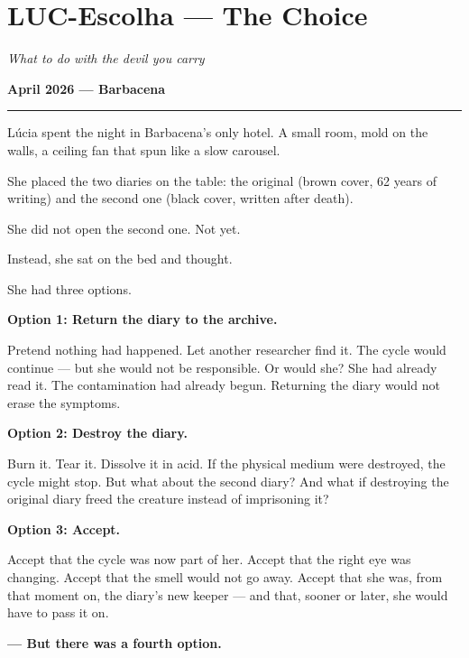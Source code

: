 \section*{\textbf{LUC-Escolha} --- The Choice}

\noindent \textit{What to do with the devil you carry}

\noindent \textbf{April 2026 --- Barbacena}

\vspace{0.5em}\noindent\rule{\textwidth}{0.5pt}\vspace{0.5em}

\noindent Lúcia spent the night in Barbacena's only hotel. A small room, mold on the walls, a ceiling fan that spun like a slow carousel.

\noindent She placed the two diaries on the table: the original (brown cover, 62 years of writing) and the second one (black cover, written after death).

\noindent She did not open the second one. Not yet.

\noindent Instead, she sat on the bed and thought.

\noindent She had three options.

\noindent \textbf{Option 1: Return the diary to the archive.}

\noindent Pretend nothing had happened. Let another researcher find it. The cycle would continue --- but she would not be responsible. Or would she? She had already read it. The contamination had already begun. Returning the diary would not erase the symptoms.

\noindent \textbf{Option 2: Destroy the diary.}

\noindent Burn it. Tear it. Dissolve it in acid. If the physical medium were destroyed, the cycle might stop. But what about the second diary? And what if destroying the original diary freed the creature instead of imprisoning it?

\noindent \textbf{Option 3: Accept.}

\noindent Accept that the cycle was now part of her. Accept that the right eye was changing. Accept that the smell would not go away. Accept that she was, from that moment on, the diary's new keeper --- and that, sooner or later, she would have to pass it on.

\noindent \textbf{--- But there was a fourth option.}


